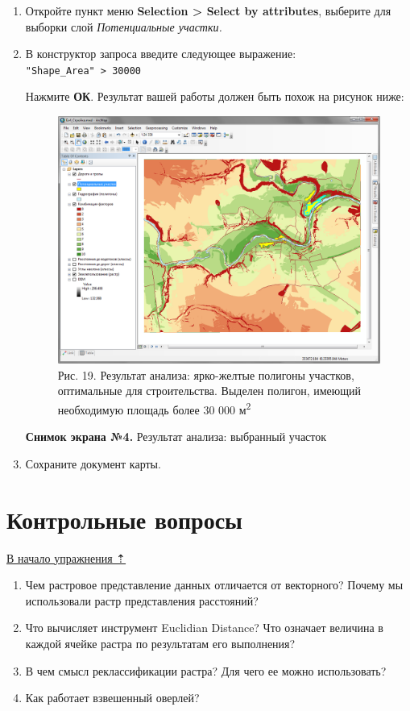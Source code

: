 \documentclass[12pt,]{book}
\begin{document}
\begin{enumerate}
\def\labelenumi{\arabic{enumi}.}
\item
  Откройте пункт меню \textbf{Selection \textgreater{} Select by attributes}, выберите для выборки слой \emph{Потенциальные участки.}
\item
  В конструктор запроса введите следующее выражение:
  \texttt{"Shape\_Area"\ \textgreater{}\ 30000}

  Нажмите \textbf{ОК}. Результат вашей работы должен быть похож на рисунок ниже:

  \begin{figure}
  \centering
  \includegraphics{images/Ex14/image30.png}
  \caption{Рис. 19. Результат анализа: ярко-желтые полигоны участков, оптимальные для строительства. Выделен полигон, имеющий необходимую площадь более 30 000 м\textsuperscript{2}}
  \end{figure}

  \textbf{Снимок экрана №4.} Результат анализа: выбранный участок
\item
  Сохраните документ карты.
\end{enumerate}

\hypertarget{weighted-overlay-questions}{%
\section{Контрольные вопросы}\label{weighted-overlay-questions}}

\protect\hyperlink{weighted-overlay}{В начало упражнения ⇡}

\begin{enumerate}
\def\labelenumi{\arabic{enumi}.}
\item
  Чем растровое представление данных отличается от векторного? Почему мы использовали растр представления расстояний?
\item
  Что вычисляет инструмент Euclidian Distance? Что означает величина в каждой ячейке растра по результатам его выполнения?
\item
  В чем смысл реклассификации растра? Для чего ее можно использовать?
\item
  Как работает взвешенный оверлей?
\end{enumerate}
\end{document}

